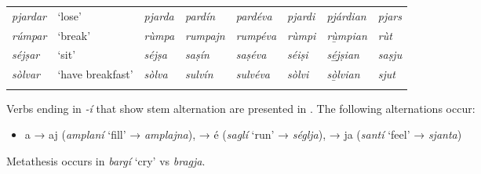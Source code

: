 \begin{sidewaystable}
\begin{tabularx}{\textwidth}{llllllll}
		\textit{pjardar} & `lose' & \textit{pjarda} & \textit{pardín} & \textit{pardéva} & \textit{pjardi} & \textit{pj̱árdian} & \textit{pjars}\\
		\textit{rúmpar} & `break' & \textit{rùmpa} & \textit{rumpajn} & \textit{rumpéva} & \textit{rùmpi} & \textit{rù̱mpian} & \textit{rùt}\\
		\textit{séjṣar} & `sit' & \textit{séjṣa}  &	\textit{saṣín} & \textit{saṣéva} & \textit{séiṣi} & \textit{sé̱j̱ṣian} & \textit{saṣju}\\
		\textit{sòlvar} & `have breakfast' & \textit{sòlva} & \textit{sulvín} & \textit{sulvéva} & \textit{sòlvi} & \textit{sò̱lvian} & \textit{sjut}\\
		\lspbottomrule
	\end{tabularx} 
\end{sidewaystable}

Verbs ending in \textit{-í} that show stem alternation are presented in  . The following alternations occur:

\begin{itemize}
	\item a → aj (\textit{amplaní} `fill' → \textit{amplajna}), → é (\textit{saglí} `run' → \textit{séglja}), → ja (\textit{santí} `feel' → \textit{sjanta})
\end{itemize}

Metathesis occurs in \textit{bargí} `cry' vs \textit{bragja}.

